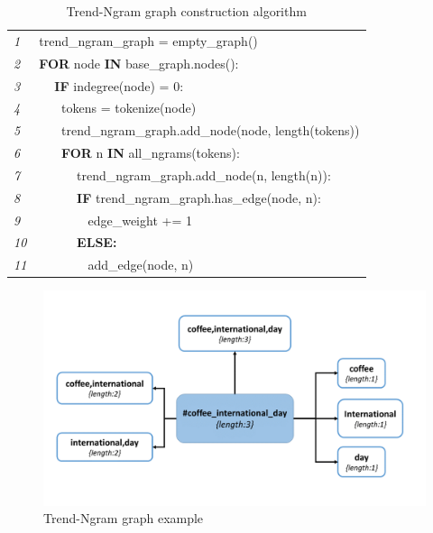 \documentclass[conference]{IEEEtran}
\begin{document}
\begin{table}
\centering
\begin{tabular}{l|l}
\hline
{\emph{1}} & trend\_ngram\_graph = empty\_graph()\\
{\emph{2}} & \textbf{FOR} node \textbf{IN} base\_graph.nodes():\\
{\emph{3}} &  $\>\>\>\>$ \textbf{IF} indegree(node) = 0:\\
{\emph{4}} &  $\>\>\>\>\>\>\>\>$tokens = tokenize(node)\\
{\emph{5}} &  $\>\>\>\>\>\>\>\>$trend\_ngram\_graph.add\_node(node, length(tokens))\\
{\emph{6}} &  $\>\>\>\>\>\>\>\>$\textbf{FOR} n \textbf{IN} all\_ngrams(tokens):\\
{\emph{7}} &  $\>\>\>\>\>\>\>\>\>\>\>\>$ trend\_ngram\_graph.add\_node(n, length(n)):\\
{\emph{8}} &  $\>\>\>\>\>\>\>\>\>\>\>\>$ \textbf{IF} trend\_ngram\_graph.has\_edge(node, n):\\
{\emph{9}} &  $\>\>\>\>\>\>\>\>\>\>\>\>\>\>\>\>$ edge\_weight += 1\\
{\emph{10}} & $\>\>\>\>\>\>\>\>\>\>\>\>$ \textbf{ELSE:}\\
{\emph{11}} & $\>\>\>\>\>\>\>\>\>\>\>\>\>\>\>\>$ add\_edge(node, n)\\
\hline
\end{tabular}
\caption{Trend-Ngram graph construction algorithm}
\label{tbl:algorithm2}
\end{table}


\begin{figure}[!tb] \centering
\includegraphics[width=\columnwidth]{images/trend_ngram_example.png}
\caption{Trend-Ngram graph example}
\label{fig:tngraph}
\end{figure}
\end{document}
